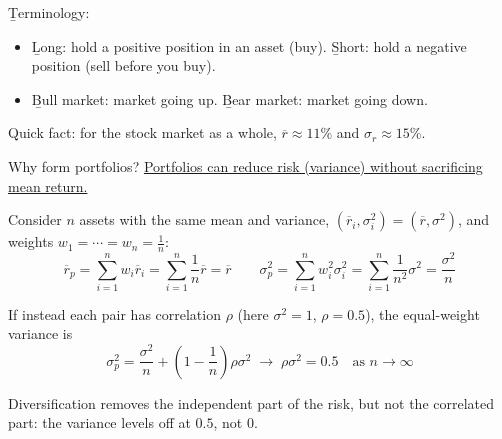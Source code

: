 \b{Terminology}:
\begin{itemize}
    \item \b{Long}: hold a positive position in an asset (buy). \b{Short}: hold a negative position (sell before you buy).
    \item \b{Bull market}: market going up. \b{Bear market}: market going down.
\end{itemize}
Quick fact: for the stock market as a whole, $\overline{r} \approx 11\%$ and $\sigma_r \approx 15\%$.

Why form portfolios? \ul{Portfolios can reduce risk (variance) without sacrificing mean return.}

Consider $n$  assets with the same mean and variance, $(\overline{r}_i, \sigma_i^2) = (\overline{r}, \sigma^2)$, and weights $w_1 = \cdots = w_n = \frac{1}{n}$:
\[\overline{r}_p = \sum_{i=1}^{n}w_i\overline{r}_i = \sum_{i=1}^{n}\frac{1}{n}\overline{r} = \overline{r} \qquad \sigma_p^2 = \sum_{i=1}^{n}w_i^2\sigma_i^2 = \sum_{i=1}^{n}\frac{1}{n^2}\sigma^2 = \boxed{\frac{\sigma^2}{n}}\]

\begin{example}
    If instead each pair has correlation $\rho$ (here $\sigma^2 = 1$, $\rho = 0.5$), the equal-weight variance is
    \[\sigma_p^2 = \frac{\sigma^2}{n} + \left(1 - \frac{1}{n}\right)\rho\sigma^2 \;\longrightarrow\; \rho\sigma^2 = 0.5 \quad \text{as } n \to \infty\]
    \begin{center}
    \end{center}
    Diversification removes the independent part of the risk, but not the correlated part: the variance levels off at $0.5$, not $0$.
\end{example}

